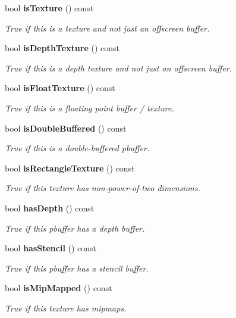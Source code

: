 \begin{CompactItemize}
bool {\bf is\-Texture} () const
\begin{CompactList}\small\item\em True if this is a texture and not just an offscreen buffer. \item\end{CompactList}\item 
bool {\bf is\-Depth\-Texture} () const
\begin{CompactList}\small\item\em True if this is a depth texture and not just an offscreen buffer. \item\end{CompactList}\item 
bool {\bf is\-Float\-Texture} () const
\begin{CompactList}\small\item\em True if this is a floating point buffer / texture. \item\end{CompactList}\item 
bool {\bf is\-Double\-Buffered} () const
\begin{CompactList}\small\item\em True if this is a double-buffered pbuffer. \item\end{CompactList}\item 
bool {\bf is\-Rectangle\-Texture} () const
\begin{CompactList}\small\item\em True if this texture has non-power-of-two dimensions. \item\end{CompactList}\item 
bool {\bf has\-Depth} () const
\begin{CompactList}\small\item\em True if this pbuffer has a depth buffer. \item\end{CompactList}\item 
bool {\bf has\-Stencil} () const
\begin{CompactList}\small\item\em True if this pbuffer has a stencil buffer. \item\end{CompactList}\item 
bool {\bf is\-Mip\-Mapped} () const
\begin{CompactList}\small\item\em True if this texture has mipmaps. \item\end{CompactList}\end{CompactItemize}
